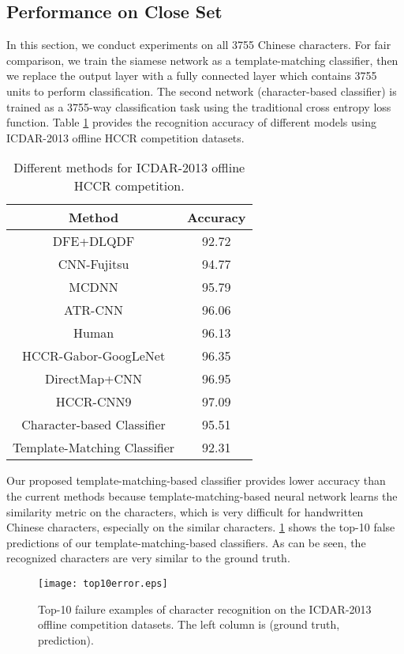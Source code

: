 \documentclass[conference]{IEEEtran}
\begin{document}
\subsection{Performance on Close Set}
In this section, we conduct experiments on all 3755 Chinese characters. For fair comparison, we train the siamese network as a template-matching classifier, then we replace the output layer with a fully connected layer which contains 3755 units to perform classification. The second network (character-based classifier) is trained as a 3755-way classification task using the traditional cross entropy loss function. Table \ref{comparision} provides the recognition accuracy of different models using ICDAR-2013 offline HCCR competition datasets.
 
\begin{table}[htb]
	\renewcommand{\arraystretch}{1.3}
	\caption{Different methods for ICDAR-2013 offline HCCR competition.}
	\label{comparision}
	\centering
	\begin{tabular}{c c}
		\hline
		Method & Accuracy \\
		\hline
		DFE+DLQDF & 92.72 \\
		\hline
		CNN-Fujitsu & 94.77 \\
		\hline
		MCDNN & 95.79 \\
		\hline
		ATR-CNN & 96.06 \\
		\hline
		Human & 96.13 \\
		\hline 
		HCCR-Gabor-GoogLeNet & 96.35 \\
		\hline
		DirectMap+CNN & 96.95 \\
		\hline
		HCCR-CNN9 & 97.09 \\
		\hline\hline
		Character-based Classifier & 95.51 \\
		\hline
		Template-Matching Classifier & 92.31 \\
		\hline	
	\end{tabular}	
\end{table}

Our proposed template-matching-based classifier provides lower accuracy than the current methods because template-matching-based neural network learns the similarity metric on the characters, which is very difficult for handwritten Chinese characters, especially on the similar characters. \figurename{\ref{error}} shows the top-10 false predictions of our template-matching-based classifiers. As can be seen, the recognized characters are very similar to the ground truth.

\begin{figure}[htb]
	\centering
	\texttt{[image: top10error.eps]}
	\caption{Top-10 failure examples of character recognition on the ICDAR-2013 offline competition datasets. The left column is (ground truth, prediction).}
	\label{error}
\end{figure}
\end{document}
